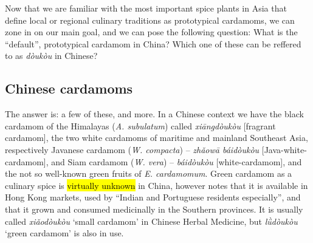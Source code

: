 \documentclass[12pt]{article}
\begin{document}


Now that we are familiar with the most important spice plants in Asia that define local or regional culinary traditions as prototypical cardamoms, we can zone in on our main goal, and we can pose the following question: What is the ``default'', prototypical cardamom in China? Which one of these can be reffered to as \textit{dòukòu} in Chinese?


\subsection{Chinese cardamoms}


The answer is: a few of these, and more. In a Chinese context we have the black cardamom of the Himalayas (\textit{A. subulatum}) called \textit{xiāngdòukòu} [fragrant cardamom], the two white cardamoms of maritime and mainland Southeast Asia, respectively Javanese cardamom (\textit{W. compacta}) -- \textit{zhǎowā
báidòukòu} [Java-white-cardamom], and Siam cardamom (\textit{W. vera}) -- \textit{báidòukòu} [white-cardamom], and the not so well-known green fruits of \textit{E. cardamomum}. Green cardamom as a culinary spice is \hl{virtually unknown} in China, however \textcite{hu_2005_food} notes that it is available in Hong Kong markets, used by ``Indian and Portuguese residents especially'', and that it grown and consumed medicinally in the Southern provinces. It is usually called \textit{xiǎodòukòu} `small cardamom' in Chinese Herbal Medicine, but \textit{lǜdòukòu} `green cardamom' is also in use.
\end{document}
